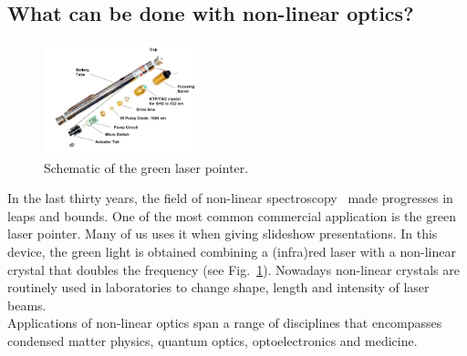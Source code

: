 \subsection{What can be done with non-linear optics?} 
\begin{figure}
  \begin{center}
    \includegraphics[width=0.4\textwidth]{Figures/lasergreen}
  \end{center}
  \caption{Schematic of the green laser pointer. \label{greenlaser}}
\end{figure}
In the last thirty years, the field of non-linear spectroscopy~\cite{bloembergen1982nonlinear} made progresses in leaps and bounds. One of the most common commercial application is the green laser pointer. Many of us uses it when giving slideshow presentations. In this device, the green light is obtained combining a (infra)red laser with a non-linear crystal that doubles the frequency (see Fig.~\ref{greenlaser}). Nowadays non-linear crystals are routinely used in laboratories to change shape, length and intensity of laser beams. \\
Applications of non-linear optics span a range of disciplines that encompasses condensed matter physics, quantum optics, optoelectronics and medicine.\\

